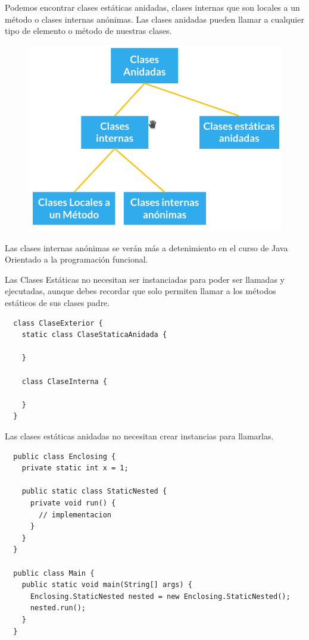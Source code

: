 \documentclass{article}
\begin{document}
Podemos encontrar clases estáticas anidadas, clases internas que son locales a
un método o clases internas anónimas. Las clases anidadas pueden llamar a
cualquier tipo de elemento o método de nuestras clases.\\

\begin{figure}[h!]
  \centering
  \includegraphics[scale=0.5]{./Pictures/039_clases_anidadas.png}
\end{figure}

Las clases internas anónimas se verán más a detenimiento en el curso de Java
Orientado a la programación funcional.

Las Clases Estáticas no necesitan ser instanciadas para poder ser llamadas y
ejecutadas, aunque debes recordar que solo permiten llamar a los métodos
estáticos de sus clases padre.\\

\begin{verbatim}
  class ClaseExterior {
    static class ClaseStaticaAnidada {

    }

    class ClaseInterna {

    }
  }
\end{verbatim}

Las clases estáticas anidadas no necesitan crear instancias para llamarlas.

\begin{verbatim}
  public class Enclosing {
    private static int x = 1;

    public static class StaticNested {
      private void run() {
        // implementacion
      }
    }
  }

  public class Main {
    public static void main(String[] args) {
      Enclosing.StaticNested nested = new Enclosing.StaticNested();
      nested.run();
    }
  }
\end{verbatim}
\end{document}
